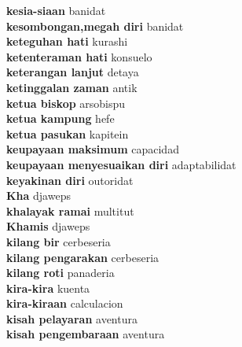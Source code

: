 \textbf{ kesia-siaan  } banidat \\
\textbf{ kesombongan,megah diri  } banidat \\
\textbf{ keteguhan hati  } kurashi \\
\textbf{ ketenteraman hati  } konsuelo \\
\textbf{ keterangan lanjut  } detaya \\
\textbf{ ketinggalan zaman  } antik \\
\textbf{ ketua biskop  } arsobispu \\
\textbf{ ketua kampung  } hefe \\
\textbf{ ketua pasukan  } kapitein \\
\textbf{ keupayaan maksimum  } capacidad \\
\textbf{ keupayaan menyesuaikan diri  } adaptabilidat \\
\textbf{ keyakinan diri  } outoridat \\
\textbf{ Kha  } djaweps \\
\textbf{ khalayak ramai  } multitut \\
\textbf{ Khamis  } djaweps \\
\textbf{ kilang bir  } cerbeseria \\
\textbf{ kilang pengarakan  } cerbeseria \\
\textbf{ kilang roti  } panaderia \\
\textbf{ kira-kira  } kuenta \\
\textbf{ kira-kiraan  } calculacion \\
\textbf{ kisah pelayaran  } aventura \\
\textbf{ kisah pengembaraan  } aventura \\
